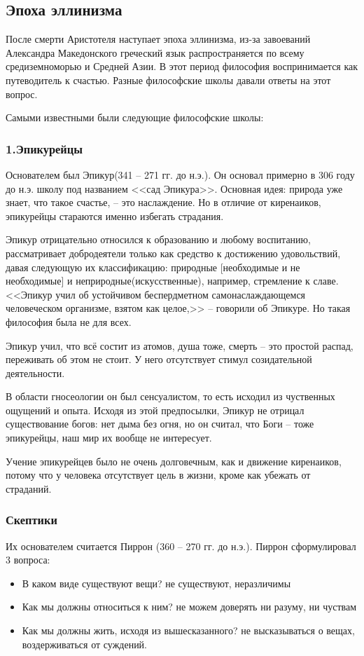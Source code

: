 \documentclass[a4paper, 12pt]{book} %
\begin{document}
\subsection{Эпоха эллинизма}
После смерти Аристотеля наступает эпоха эллинизма, из-за завоеваний Александра Македонского греческий язык распространяется по всему средиземноморью и Средней Азии. В этот период философия воспринимается как путеводитель к счастью. Разные философские школы давали ответы на этот вопрос.

Самыми известными были следующие философские школы:

\subsubsection*{1.Эпикурейцы}
Основателем был Эпикур(341 -- 271 гг. до н.э.). Он основал примерно в 306 году до н.э. школу под названием <<сад Эпикура>>. Основная идея: природа уже знает, что такое счастье, -- это наслаждение. Но в отличие от киренаиков, эпикурейцы стараются именно избегать страдания. 

Эпикур отрицательно относился к образованию и любому воспитанию, рассматривает добродеятели только как средство к достижению удовольствий, давая следующую их классификацию:
природные [необходимые и не необходимые] и неприродные(искусственные), например, стремление к славе. <<Эпикур учил об устойчивом беспердметном самонаслаждающемся человеческом организме, взятом как целое,>> -- говорили об Эпикуре. Но такая философия была не для всех. 

Эпикур учил, что всё состит из атомов, душа тоже, смерть -- это простой распад, переживать об этом не стоит. У него отсутствует стимул созидательной деятельности. 

В области гносеологии он был сенсуалистом, то есть исходил из чуственных ощущений и опыта. Исходя из этой предпосылки, Эпикур не отрицал существование богов: нет дыма без огня, но он считал, что Боги -- тоже эпикурейцы, наш мир их вообще не интересует.

Учение эпикурейцев было не очень долговечным, как и движение киренаиков, потому что у человека отсутствует цель в жизни, кроме как убежать от страданий.

\subsubsection{Скептики	}
Их основателем считается Пиррон (360 -- 270 гг. до н.э.). Пиррон сформулировал 3 вопроса:
\begin{itemize}
\item В каком виде существуют вещи? не существуют, неразличимы
\item Как мы должны относиться к ним?  не можем доверять ни разуму, ни чуствам
\item Как мы должны жить, исходя из вышесказанного? не высказываться о вещах, воздерживаться от суждений. 
\end{itemize}
\end{document}
